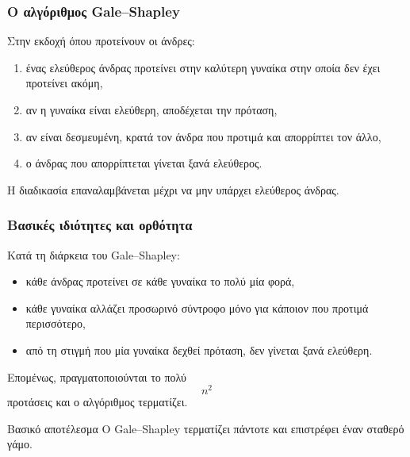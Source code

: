 \documentclass{beamer}
\begin{document}
	\begin{frame}
		\frametitle{Ο αλγόριθμος Gale--Shapley}
		
		Στην εκδοχή όπου προτείνουν οι άνδρες:
		
		\begin{enumerate}
			\item ένας ελεύθερος άνδρας προτείνει στην καλύτερη γυναίκα στην οποία δεν έχει προτείνει ακόμη,
			\item αν η γυναίκα είναι ελεύθερη, αποδέχεται την πρόταση,
			\item αν είναι δεσμευμένη, κρατά τον άνδρα που προτιμά και απορρίπτει τον άλλο,
			\item ο άνδρας που απορρίπτεται γίνεται ξανά ελεύθερος.
		\end{enumerate}
		
		\vspace{0.3cm}
		
		Η διαδικασία επαναλαμβάνεται μέχρι να μην υπάρχει ελεύθερος άνδρας.
	\end{frame}
	
	\begin{frame}
		\frametitle{Βασικές ιδιότητες και ορθότητα}
		
		Κατά τη διάρκεια του Gale--Shapley:
		
		\begin{itemize}
			\item κάθε άνδρας προτείνει σε κάθε γυναίκα το πολύ μία φορά,
			\item κάθε γυναίκα αλλάζει προσωρινό σύντροφο μόνο για κάποιον που προτιμά περισσότερο,
			\item από τη στιγμή που μία γυναίκα δεχθεί πρόταση, δεν γίνεται ξανά ελεύθερη.
		\end{itemize}
		
		Επομένως, πραγματοποιούνται το πολύ
		\[
		n^2
		\]
		προτάσεις και ο αλγόριθμος τερματίζει.
		
		\begin{block}{Βασικό αποτέλεσμα}
			Ο Gale--Shapley τερματίζει πάντοτε και επιστρέφει έναν σταθερό γάμο.
		\end{block}
	\end{frame}
	
\end{document}
